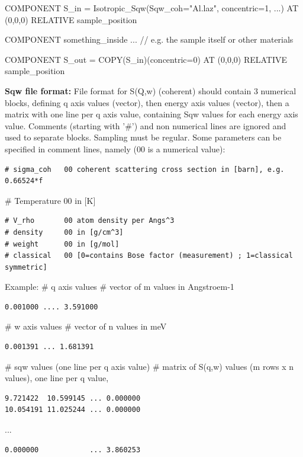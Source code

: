 COMPONENT S\_in = Isotropic\_Sqw(Sqw\_coh="Al.laz", concentric=1, ...) AT (0,0,0) RELATIVE sample\_position

COMPONENT something\_inside ... // e.g. the sample itself or other materials

COMPONENT S\_out = COPY(S\_in)(concentric=0) AT (0,0,0) RELATIVE sample\_position

\textbf{Sqw file format:} File format for S(Q,w) (coherent) should contain 3 numerical blocks, defining q axis values (vector), then energy axis values (vector), then a matrix with one line per q axis value, containing Sqw values for each energy axis value. Comments (starting with '\#') and non numerical lines are ignored and used to separate blocks. Sampling must be regular. Some parameters can be specified in comment lines, namely (00 is a numerical value):

\begin{verbatim}
# sigma_coh   00 coherent scattering cross section in [barn], e.g. 0.66524*f
\end{verbatim}

\# Temperature 00 in [K]

\begin{verbatim}
# V_rho       00 atom density per Angs^3
# density     00 in [g/cm^3]
# weight      00 in [g/mol]
# classical   00 [0=contains Bose factor (measurement) ; 1=classical symmetric]
\end{verbatim}

Example: \# q axis values \# vector of m values in Angstroem-1

\begin{verbatim}
0.001000 .... 3.591000
\end{verbatim}

\# w axis values \# vector of n values in meV

\begin{verbatim}
0.001391 ... 1.681391
\end{verbatim}

\# sqw values (one line per q axis value) \# matrix of S(q,w) values (m rows x n values), one line per q value,

\begin{verbatim}
9.721422  10.599145 ... 0.000000
10.054191 11.025244 ... 0.000000
\end{verbatim}

...

\begin{verbatim}
0.000000            ... 3.860253
\end{verbatim}

